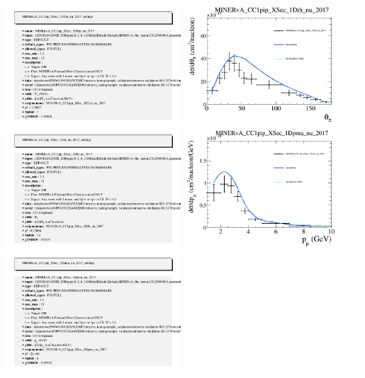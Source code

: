 \documentclass{article}
\begin{document}
\includegraphics[width=0.49\textwidth]{figures/nuisance_MINERvA_CC1pip_XSec_1DTpi_nu_2017_info.png}
\centering
\includegraphics[width=0.49\textwidth]{figures/nuisance_MINERvA_CC1pip_XSec_1Dth_nu_2017_comp.png}
\includegraphics[width=0.49\textwidth]{figures/nuisance_MINERvA_CC1pip_XSec_1Dth_nu_2017_info.png}
\centering
\includegraphics[width=0.49\textwidth]{figures/nuisance_MINERvA_CC1pip_XSec_1Dpmu_nu_2017_comp.png}
\includegraphics[width=0.49\textwidth]{figures/nuisance_MINERvA_CC1pip_XSec_1Dpmu_nu_2017_info.png}
\end{document}
